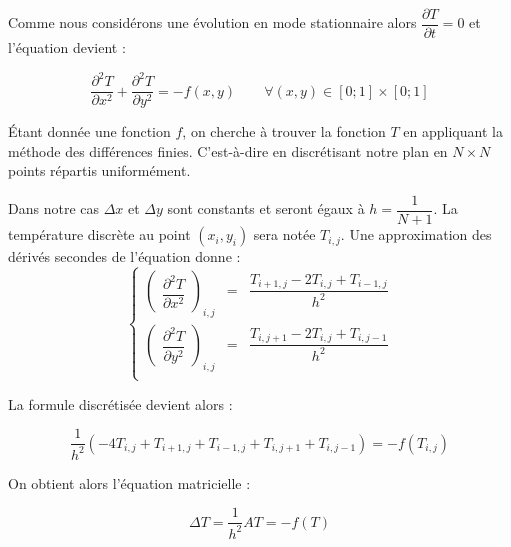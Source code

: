 \documentclass{article}
\begin{document}
Comme nous considérons une évolution en mode stationnaire alors $\dfrac{\partial T}{\partial t} = 0$ et l'équation devient :

$$\displaystyle{\frac{\partial^2 T}{\partial x^2} + \frac{\partial^2 T}{\partial y^2} = -f(x,y) \quad \quad \forall(x,y) \in [0;1] \times [0;1]}$$


Étant donnée une fonction $f$, on cherche à trouver la fonction $T$ en appliquant la méthode des différences finies. C'est-à-dire en discrétisant notre plan en \texttt{$N\times N$} points répartis uniformément.

Dans notre cas $\Delta x$ et $\Delta y$ sont constants et seront égaux à $h=\dfrac{1}{N+1}$. La température discrète au point $(x_{i},y_{i})$  sera notée $T_{i,j}$. Une approximation des dérivés secondes de l'équation donne :
\[ \left\{
\begin{array}{rcr}
  
  \displaystyle{\begin{pmatrix} \dfrac{\partial^{2} T}{\partial x^{2}} \end{pmatrix}_{i,j}} & = &\displaystyle{\dfrac{T_{i+1,j} - 2T_{i,j} + T_{i-1,j}}{h^{2}}} \\
  \displaystyle{\begin{pmatrix} \dfrac{\partial^{2} T}{\partial y^{2}} \end{pmatrix}_{i,j}} & = & \displaystyle{\dfrac{T_{i,j+1} - 2T_{i,j} + T_{i,j-1}}{h^{2}}} \\
\end{array}
\right.\]

La formule discrétisée devient alors :

\begin{equation}
  \dfrac{1}{h^{2}}(-4T_{i,j} + T_{i+1,j} + T_{i-1,j} + T_{i,j+1} + T_{i,j-1} ) = -f(T_{i,j})
\end{equation}

On obtient alors l'équation matricielle :

\begin{equation}
  \Delta T = \dfrac{1}{h^{2}}A T = -f(T)
\end{equation}
\end{document}
